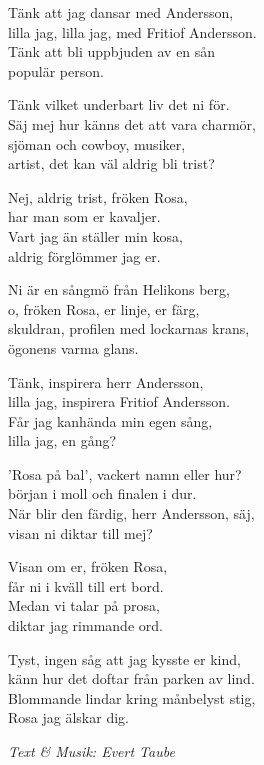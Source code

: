 \vspace{10pt}
Tänk att jag dansar med Andersson,\\
lilla jag, lilla jag, med Fritiof Andersson. \\
Tänk att bli uppbjuden av en sån \\
populär person.\par
\vspace{10pt}
Tänk vilket underbart liv det ni för.\\
Säj mej hur känns det att vara charmör,\\
sjöman och cowboy, musiker,\\
artist, det kan väl aldrig bli trist?\par
\vspace{10pt}
Nej, aldrig trist, fröken Rosa,\\
har man som er kavaljer.\\
Vart jag än ställer min kosa,\\
aldrig förglömmer jag er.\par
\vspace{10pt}
Ni är en sångmö från Helikons berg,\\
o, fröken Rosa, er linje, er färg,\\
skuldran, profilen med lockarnas krans,\\
ögonens varma glans.\par
\vspace{10pt}
Tänk, inspirera herr Andersson,\\
lilla jag, inspirera Fritiof Andersson.\\
Får jag kanhända min egen sång,\\
lilla jag, en gång?\par
\vspace{10pt}
'Rosa på bal', vackert namn eller hur?\\
början i moll och finalen i dur.\\
När blir den färdig, herr Andersson, säj,\\
visan ni diktar till mej?\par
\vspace{10pt}
Visan om er, fröken Rosa,\\
får ni i kväll till ert bord.\\
Medan vi talar på prosa,\\
diktar jag rimmande ord.\par
\vspace{10pt}
Tyst, ingen såg att jag kysste er kind,\\
känn hur det doftar från parken av lind. \\
Blommande lindar kring månbelyst stig,\\
Rosa jag älskar dig.
\par
\vspace{10pt}
{\footnotesize\textit{Text \& Musik: Evert Taube}}
